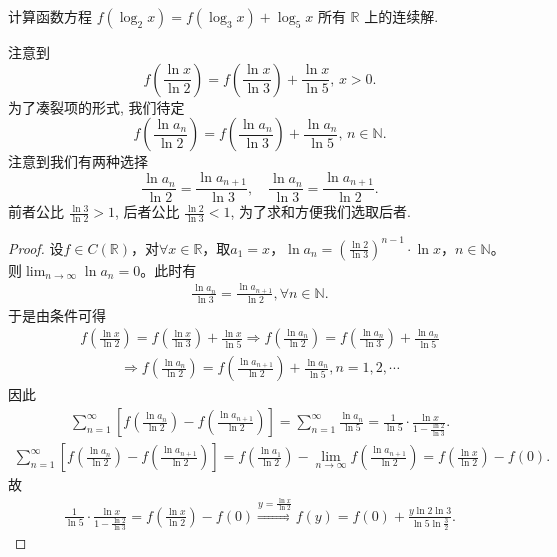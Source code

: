 \documentclass[../../main.tex]{subfiles}%
\begin{document}
\begin{example}
计算函数方程 \( f(\log_2 x) = f(\log_3 x) + \log_5 x \) 所有 \(\mathbb{R}\) 上的连续解.
\end{example}
\begin{note}
注意到
\[
f\left( \frac{\ln x}{\ln 2} \right) = f\left( \frac{\ln x}{\ln 3} \right) + \frac{\ln x}{\ln 5}, \, x > 0.
\]
为了凑裂项的形式, 我们待定
\[
f\left( \frac{\ln a_n}{\ln 2} \right) = f\left( \frac{\ln a_n}{\ln 3} \right) + \frac{\ln a_n}{\ln 5}, \, n \in \mathbb{N}.
\]
注意到我们有两种选择
\[
\frac{\ln a_n}{\ln 2} = \frac{\ln a_{n+1}}{\ln 3}, \quad \frac{\ln a_n}{\ln 3} = \frac{\ln a_{n+1}}{\ln 2}.
\]
前者公比 \(\frac{\ln 3}{\ln 2} > 1\), 后者公比 \(\frac{\ln 2}{\ln 3} < 1\), 为了求和方便我们选取后者.
\end{note}
\begin{proof}

设$f \in C(\mathbb{R})$，对$\forall x \in \mathbb{R}$，取$a_1 = x$，$\ln a_n = \left( \frac{\ln 2}{\ln 3} \right)^{n-1} \cdot \ln x$，$n \in \mathbb{N}$。则$\lim_{n \to \infty} \ln a_n = 0$。此时有
\begin{align*}
\frac{\ln a_n}{\ln 3} = \frac{\ln a_{n+1}}{\ln 2}, \forall n \in \mathbb{N}.
\end{align*}
于是由条件可得
\begin{align*}
f\left( \frac{\ln x}{\ln 2} \right) = f\left( \frac{\ln x}{\ln 3} \right) + \frac{\ln x}{\ln 5} \Rightarrow f\left( \frac{\ln a_n}{\ln 2} \right) = f\left( \frac{\ln a_n}{\ln 3} \right) + \frac{\ln a_n}{\ln 5}
\end{align*}
\begin{align*}
\Rightarrow f\left( \frac{\ln a_n}{\ln 2} \right) = f\left( \frac{\ln a_{n+1}}{\ln 2} \right) + \frac{\ln a_n}{\ln 5}, n = 1, 2, \cdots
\end{align*}
因此
\begin{align*}
\sum_{n=1}^{\infty} \left[ f\left( \frac{\ln a_n}{\ln 2} \right) - f\left( \frac{\ln a_{n+1}}{\ln 2} \right) \right] = \sum_{n=1}^{\infty} \frac{\ln a_n}{\ln 5} = \frac{1}{\ln 5} \cdot \frac{\ln x}{1 - \frac{\ln 2}{\ln 3}}.
\end{align*}
\begin{align*}
\sum_{n=1}^{\infty} \left[ f\left( \frac{\ln a_n}{\ln 2} \right) - f\left( \frac{\ln a_{n+1}}{\ln 2} \right) \right] = f\left( \frac{\ln a_1}{\ln 2} \right) - \lim_{n \to \infty} f\left( \frac{\ln a_{n+1}}{\ln 2} \right) = f\left( \frac{\ln x}{\ln 2} \right) - f(0).
\end{align*}
故
\begin{align*}
\frac{1}{\ln 5} \cdot \frac{\ln x}{1 - \frac{\ln 2}{\ln 3}} = f\left( \frac{\ln x}{\ln 2} \right) - f(0) \stackrel{y = \frac{\ln x}{\ln 2}}{\Rightarrow} f(y) = f(0) + \frac{y \ln 2 \ln 3}{\ln 5 \ln \frac{3}{2}}.
\end{align*}

\end{proof}
\end{document}
